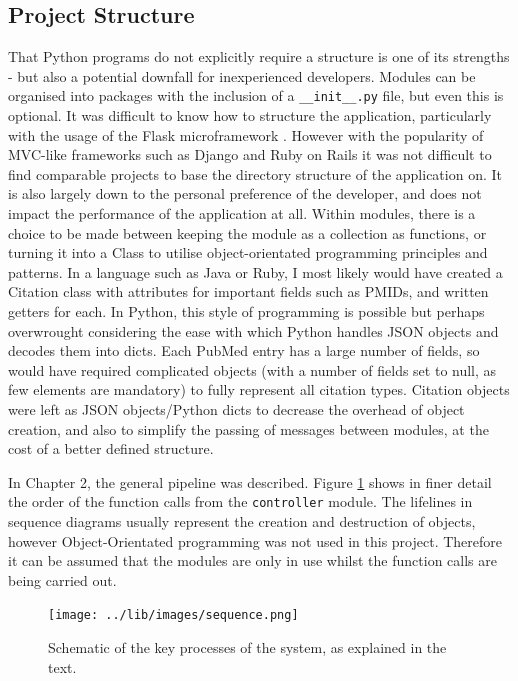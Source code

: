 \documentclass[Report.tex]{subfiles}
\begin{document}
\subsection{Project Structure}
\noindent That Python programs do not explicitly require a structure is one of its strengths - but also a potential downfall for inexperienced developers. Modules can be organised into packages with the inclusion of a \texttt{\_\_init\_\_.py} file, but even this is optional. It was difficult to know how to structure the application, particularly with the usage of the Flask microframework . However with the popularity of MVC-like frameworks such as Django and Ruby on Rails it was not difficult to find comparable projects to base the directory structure of the application on. It is also largely down to the personal preference of the developer, and does not impact the performance of the application at all. Within modules, there is a choice to be made between keeping the module as a collection as functions, or turning it into a Class to utilise object-orientated programming principles and patterns. In a language such as Java or Ruby, I most likely would have created a Citation class with attributes for important fields such as PMIDs, and written getters for each. In Python, this style of programming is possible but perhaps overwrought considering the ease with which Python handles JSON objects and decodes them into dicts. Each PubMed entry has a large number of fields, so would have required complicated objects (with a number of fields set to null, as few elements are mandatory) to fully represent all citation types. Citation objects were left as JSON objects/Python dicts to decrease the overhead of object creation, and also to simplify the passing of messages between modules, at the cost of a better defined structure.\newline
 
\noindent In Chapter 2, the general pipeline was described. Figure \ref{fig:sequence} shows in finer detail the order of the function calls from the \texttt{controller} module. The lifelines in sequence diagrams usually represent the creation and destruction of objects, however Object-Orientated programming was not used in this project. Therefore it can be assumed that the modules are only in use whilst the function calls are being carried out.\newline

\begin{figure}[ht!]
\begin{center}
\texttt{[image: ../lib/images/sequence.png]}
\caption{Schematic of the key processes of the system, as explained in the text.}
\label{fig:sequence}
\end{center}
\end{figure}
\end{document}
